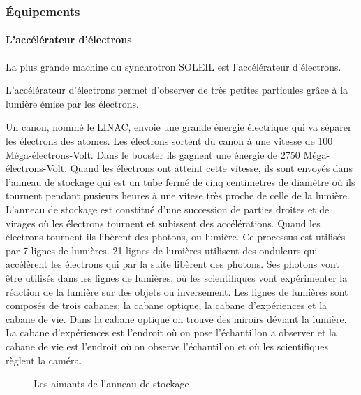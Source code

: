 		\subsubsection{Équipements}
			
			\paragraph{L'accélérateur d'électrons}
				La plus grande machine du synchrotron SOLEIL est l'accélérateur d'électrons.
				
				L'accélérateur d'électrons permet d'observer de très petites particules grâce à la lumière émise par les électrons.
				
				Un canon, nommé le LINAC, envoie une grande énergie électrique qui va séparer les électrons des atomes. Les électrons sortent du canon à une vitesse de 100 Méga-électrons-Volt.  Dans le booster ils gagnent une énergie de 2750 Méga-électrons-Volt. Quand les électrons ont atteint cette vitesse, ils sont envoyés dans l'anneau de stockage qui est un tube fermé de cinq centimetres de diamètre où ils tournent pendant pusieurs heures à une vitese très proche de celle de la lumière. L'anneau de stockage est constitué d'une succession de parties droites et de virages où les électrons tournent et subissent des accélérations. Quand les électrons tournent ils libèrent des photons, ou lumière. Ce processus est utilisés par 7 lignes de lumières. 21 lignes de lumières utilisent des onduleurs qui accélèrent les électrons qui par la suite libèrent des photons. Ses photons vont être utilisés dans les lignes de lumières, où les scientifiques vont expérimenter la réaction de la lumière sur des objets ou inversement. Les lignes de lumières sont composés de trois cabanes; la cabane optique, la cabane d'expériences et la cabane de vie. Dans la cabane optique on trouve des miroirs déviant la lumière. La cabane d'expériences est l'endroit où on pose l'échantillon a observer et la cabane de vie est l'endroit où on observe l'échantillon et où les scientifiques règlent la caméra. 
			\begin{figure}
 				 \centering
 				 \caption{Les aimants de l'anneau de stockage}
				\end{figure}

